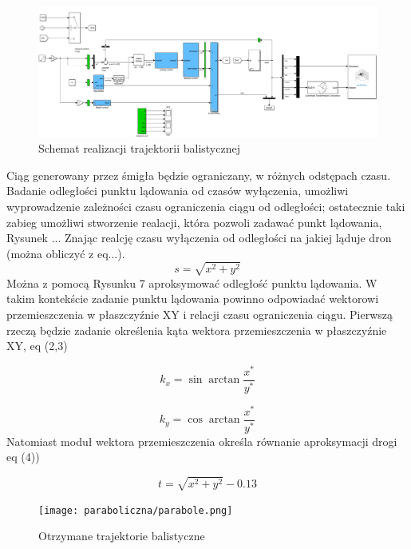 \documentclass[polish,11pt,a4paper]{article}
\begin{document}
\begin{figure}[ht]
    \centering
    \includegraphics[width=1\linewidth]{paraboliczna/sc_parab.png}
    \caption{Schemat realizacji trajektorii balistycznej}
    \label{fig:enter-label}
\end{figure}

Ciąg generowany przez śmigła będzie ograniczany, w różnych odstępach czasu. Badanie odległości punktu
lądowania od czasów wyłączenia, umożliwi wyprowadzenie zależności czasu ograniczenia ciągu od odległości;
ostatecznie taki zabieg umożliwi stworzenie realacji, która pozwoli zadawać punkt lądowania, Rysunek ...
Znając realcję czasu wyłączenia od odległości na jakiej ląduje dron (można obliczyć z eq...).
\begin{equation}
    s = \sqrt{x^{2}+y^{2}}
\end{equation}
Można z pomocą Rysunku 7 aproksymować odległość punktu lądowania. W takim kontekście zadanie punktu lądowania powinno odpowiadać
wektorowi przemieszczenia w płaszczyźnie XY i relacji czasu ograniczenia ciągu. Pierwszą rzeczą będzie zadanie określenia kąta wektora przemieszczenia
w płaszczyźnie XY, eq (2,3)


\begin{equation}
    k_{x} = \sin \arctan \frac{x^{*}}{y^{*}}
\end{equation}

\begin{equation}
    k_{y} = \cos \arctan \frac{x^{*}}{y^{*}}
\end{equation}
Natomiast moduł wektora przemieszczenia określa równanie aproksymacji drogi eq (4))

\begin{equation}
    t = \sqrt{x^{2}+y^{2}} - 0.13
\end{equation}

\begin{figure}[ht]
    \centering
    \texttt{[image: paraboliczna/parabole.png]}
    \caption{Otrzymane trajektorie balistyczne}
    \label{fig:enter-label}
\end{figure}
\end{document}
